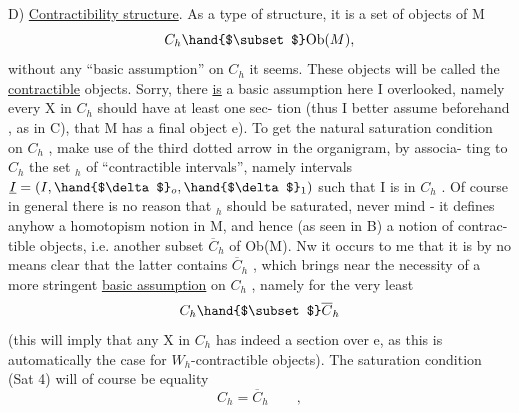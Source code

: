 D) \uline{Contractibility structure}.  \hand{(}As a type of structure, it is a
set of objects of M
\[ C_h\hand{$\subset$}\mathrm{Ob}(M) , \]
without any ``basic assumption'' on $C_h$ it seems. These objects will be
called the \uline{contractible} objects. Sorry, there \uline{is} a basic assumption
here I  overlooked,  namely every X in $C_h$ should have at least one sec-%
tion (thus I better assume beforehand , as in C), that M has a final
object e). To get the natural saturation condition on $C_h$ , 
 make use of the third dotted arrow in the organigram, by associa-%
ting to $C_h$ the set \hand{$\Sigma$}$_h$ of ``contractible intervals'', namely intervals
$\underline{I} = (I, \hand{$\delta$}_o,\hand{$\delta$}_1)$ such that I is in $C_h$ . Of course in general there is no
reason that \hand{$\Sigma$}$_h$ should be saturated, never mind - it defines anyhow 
a homotopism notion in M, and hence (as seen in B) a notion of contrac-%
tible objects, i.e. another subset $\overline{C}_h$ of Ob(M). Nw it occurs to  me
that it is by no means clear that the latter contains $\overline{C}_h$ , which
brings near the necessity of a more stringent \uline{basic assumption} on $C_h$ ,
namely for the very least
\[ C_h\hand{$\subset$}\overline{C}_h \]
(this will imply that any X in $C_h$ has indeed a section over e, as this
is automatically the case for $W_h$-contractible objects). The saturation
condition (Sat 4) will of course be equality
\[ C_h = \overline{C}_h \qquad , \]
